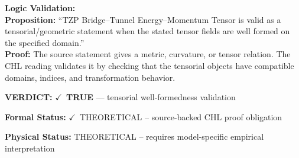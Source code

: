 \textbf{Logic Validation:}\\
\textbf{Proposition:} ``TZP Bridge--Tunnel Energy--Momentum Tensor is valid as a tensorial/geometric statement
when the stated tensor fields are well formed on the specified domain.''\\
\textbf{Proof:} The source statement gives a metric, curvature, or tensor relation. The CHL reading
validates it by checking that the tensorial objects have compatible domains, indices,
and transformation behavior.

\textbf{VERDICT:} \ensuremath{\checkmark}\ \textbf{TRUE} --- tensorial well-formedness validation

\textbf{Formal Status:} \ensuremath{\checkmark}\ THEORETICAL -- source-backed CHL proof obligation

\textbf{Physical Status:} THEORETICAL -- requires model-specific empirical interpretation
\par\vspace{0.45em}
\par
\ifTZPDarkEdition
{}
\fi
\endgroup
\endgroup
